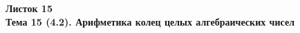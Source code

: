 \documentclass[a4paper, 11pt]{article}
\begin{document}
\begin{center} \Large \bf Листок 15\\ Тема 15 (4.2). Арифметика колец целых алгебраических чисел \end{center}


\end{document}
